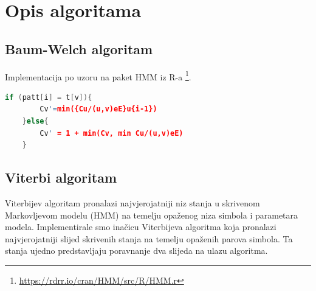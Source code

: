 \documentclass[times, utf8, seminar, numeric]{fer}
\begin{document}
\chapter{Opis algoritama}

\section{Baum-Welch algoritam}

Implementacija po uzoru na paket HMM iz R-a \footnote{\url{https://rdrr.io/cran/HMM/src/R/HMM.r}}. 
\begin{lstlisting}[language=C++, caption={Ažuriranje vrijednosti Cv}, captionpos=b, label={k1}]
	if (patt[i] = t[v]){
		Cv'=min({Cu/(u,v)eE}u{i-1})
	}else{
		Cv' = 1 + min(Cv, min Cu/(u,v)eE)
	}
\end{lstlisting}



\section{Viterbi algoritam}
Viterbijev algoritam pronalazi najvjerojatniji niz stanja u skrivenom Markovljevom modelu (HMM) na temelju opaženog niza simbola i parametara modela. Implementirale smo inačicu Viterbijeva algoritma koja pronalazi najvjerojatniji slijed skrivenih stanja na temelju opaženih parova simbola. Ta stanja ujedno predstavljaju poravnanje dva slijeda na ulazu algoritma. 
\end{document}
